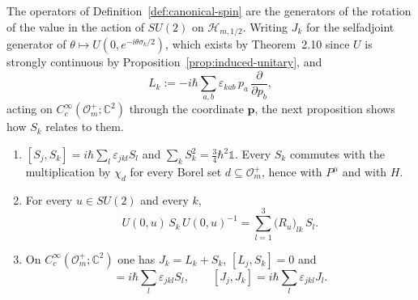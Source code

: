 The operators of Definition~\ref{def:canonical-spin} are the generators of the rotation of the value in the action of $SU(2)$ on $\mathcal{H}_{m,1/2}$. Writing $J_k$ for the selfadjoint generator of $\theta\mapsto U(0,e^{-i\theta\sigma_k/2})$, which exists by Theorem~2.10 since $U$ is strongly continuous by Proposition~\ref{prop:induced-unitary}, and
\begin{equation*}
	L_k:=-i\hbar\sum_{a,b}\varepsilon_{kab}\,p_a\,\frac{\partial}{\partial p_b},
\end{equation*}
acting on $C_c^\infty(\mathcal{O}_m^+;\mathbb{C}^2)$ through the coordinate $\mathbf{p}$, the next proposition shows how $S_k$ relates to them.

\begin{proposition}\label{prop:spin-rotations}
	\begin{enumerate}
		\item $[S_j,S_k]=i\hbar\sum_l\varepsilon_{jkl}S_l$ and $\sum_kS_k^2=\frac34\hbar^2\mathbb{1}$. Every $S_k$ commutes with the multiplication by $\chi_d$ for every Borel set $d\subseteq\mathcal{O}_m^+$, hence with $P^\mu$ and with $H$.
		\item For every $u\in SU(2)$ and every $k$,
		\begin{equation}\label{eq:spin-rotation}
			U(0,u)\,S_k\,U(0,u)^{-1}=\sum_{l=1}^3\big(R_u\big)_{lk}\,S_l.
		\end{equation}
		\item On $C_c^\infty(\mathcal{O}_m^+;\mathbb{C}^2)$ one has $J_k=L_k+S_k$, $[L_j,S_k]=0$ and
		\begin{equation*}
			[J_j,S_k]=i\hbar\sum_l\varepsilon_{jkl}S_l,\qquad [J_j,J_k]=i\hbar\sum_l\varepsilon_{jkl}J_l.
		\end{equation*}
	\end{enumerate}
\end{proposition}

